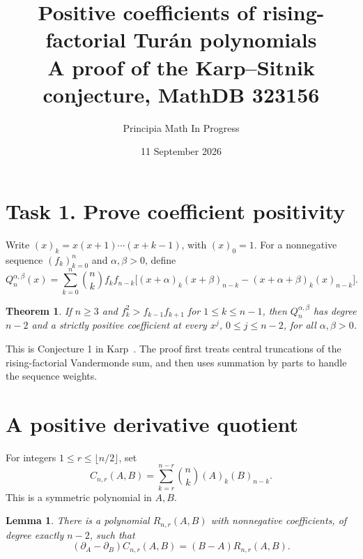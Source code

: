 \documentclass[10pt]{article}
\title{Positive coefficients of rising-factorial Tur\'an polynomials\\
\large A proof of the Karp--Sitnik conjecture, MathDB 323156}
\author{Principia Math In Progress}
\date{11 September 2026}
\newtheorem{theorem}{Theorem}
\newtheorem{lemma}{Lemma}
\begin{document}
\maketitle

\section*{Task 1. Prove coefficient positivity}

Write $(x)_k=x(x+1)\cdots(x+k-1)$, with $(x)_0=1$.
For a nonnegative sequence $(f_k)_{k=0}^n$ and $\alpha,\beta>0$, define
\[
 Q_n^{\alpha,\beta}(x)=
 \sum_{k=0}^n \binom nk f_kf_{n-k}
 \bigl[(x+\alpha)_k(x+\beta)_{n-k}
       -(x+\alpha+\beta)_k(x)_{n-k}\bigr].
\]

\begin{theorem}
If $n\geq3$ and $f_k^2>f_{k-1}f_{k+1}$ for $1\leq k\leq n-1$,
then $Q_n^{\alpha,\beta}$ has degree $n-2$ and a strictly positive
coefficient at every $x^j$, $0\leq j\leq n-2$, for all $\alpha,\beta>0$.
\end{theorem}

This is Conjecture 1 in Karp~\cite{K}. The proof first treats central
truncations of the rising-factorial Vandermonde sum, and then uses
summation by parts to handle the sequence weights.

\section*{A positive derivative quotient}

For integers $1\leq r\leq\lfloor n/2\rfloor$, set
\[
 C_{n,r}(A,B)=
 \sum_{k=r}^{n-r}\binom nk(A)_k(B)_{n-k}.
\]
This is a symmetric polynomial in $A,B$.

\begin{lemma}\label{lem:derivative}
There is a polynomial $R_{n,r}(A,B)$ with nonnegative coefficients,
of degree exactly $n-2$, such that
\begin{equation}
 (\partial_A-\partial_B)C_{n,r}(A,B)
 =(B-A)R_{n,r}(A,B).
 \label{eq:derivative}
\end{equation}
\end{lemma}
\end{document}
